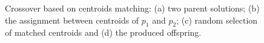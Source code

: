 
\begin{figure}[H]
\centering
{}
\caption{Crossover based on centroids matching: (a) two parent solutions; (b) the assignment between centroids of $p_1$ and $p_2$; (c) random selection of matched centroids and (d) the produced offspring.}
\label{fig:crossover}
\end{figure}

